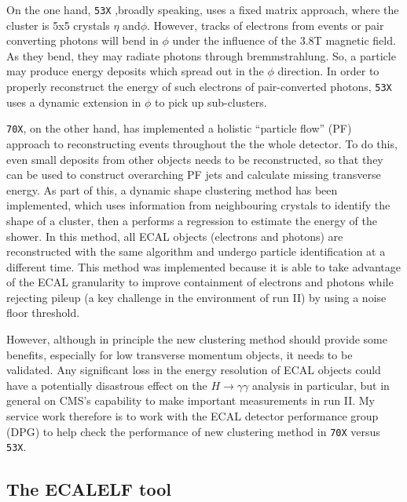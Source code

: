 \documentclass[10pt]{article}
\begin{document}
On the one hand, \texttt{53X} ,broadly speaking, uses a fixed matrix approach, where the cluster is 5x5 crystals  $\eta$ and$\phi$. However, tracks of electrons from events or pair converting photons will bend in $\phi$ under the influence of the 3.8T magnetic field. As they bend, they may radiate photons through bremmstrahlung. So, a particle may produce energy deposits which spread out in the $\phi$ direction. In order to properly reconstruct the energy of such electrons of pair-converted photons, \texttt{53X} uses a dynamic extension in $\phi$ to pick up sub-clusters.

\texttt{70X}, on the other hand, has implemented a holistic ``particle flow'' (PF) ~\cite{particleFlow} approach to reconstructing events throughout the the whole detector. To do this, even small deposits from other objects needs to be reconstructed, so that they can be used to construct overarching PF jets and calculate missing transverse energy. As part of this, a dynamic shape clustering method has been implemented, which uses information from neighbouring crystals to identify the shape of a cluster, then a performs a regression to estimate the energy of the shower. In this method, all ECAL objects (electrons and photons) are reconstructed with the same algorithm and undergo particle identification at a different time. This method was implemented because it is able to take advantage of the ECAL granularity to improve containment of electrons and photons while rejecting pileup (a key challenge in the environment of run II) by using a noise floor threshold.

However, although in principle the new clustering method should provide some benefits, especially for low transverse momentum objects, it needs to be validated. Any significant loss in the energy resolution of ECAL objects could have a potentially disastrous effect on the $H \rightarrow \gamma \gamma$ analysis in particular, but in general on CMS's capability to make important measurements in run II. My service work therefore is to work with the ECAL detector performance group (DPG) to help check the performance of new clustering method in \texttt{70X} versus \texttt{53X}. 

\subsection{The ECALELF tool}
\end{document}
